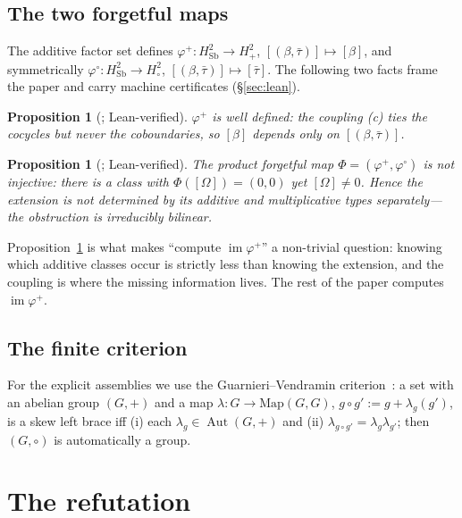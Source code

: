 \documentclass[11pt,reqno]{amsart}
\theoremstyle{plain}
\newtheorem{proposition}[theorem]{Proposition}
\theoremstyle{definition}
\newcommand{\Sb}{\mathrm{Sb}}
\newcommand{\im}{\operatorname{im}}
\newcommand{\Aut}{\operatorname{Aut}}
\begin{document}
\subsection{The two forgetful maps}
The additive factor set defines $\varphi^{+}\colon H^2_{\Sb}\to H^2_+$,
$[(\beta,\bar\tau)]\mapsto[\beta]$, and symmetrically
$\varphi^{\circ}\colon H^2_{\Sb}\to H^2_\circ$, $[(\beta,\bar\tau)]\mapsto[\bar\tau]$. The
following two facts frame the paper and carry machine certificates (\S\ref{sec:lean}).

\begin{proposition}[{\cite[Thm.~3.7]{BilinearNote}}; Lean-verified]\label{prop:descend}
$\varphi^{+}$ is well defined: the coupling (c) ties the \emph{cocycles} but never the
\emph{coboundaries}, so $[\beta]$ depends only on $[(\beta,\bar\tau)]$.
\end{proposition}

\begin{proposition}[{\cite[W$_4$]{BilinearNote}}; Lean-verified]\label{prop:noninj}
The product forgetful map $\Phi=(\varphi^{+},\varphi^{\circ})$ is \emph{not} injective:
there is a class with $\Phi([\Omega])=(0,0)$ yet $[\Omega]\neq0$. Hence the extension is
not determined by its additive and multiplicative types separately---the obstruction is
irreducibly bilinear.
\end{proposition}

Proposition~\ref{prop:noninj} is what makes ``compute $\im\varphi^{+}$'' a non-trivial
question: knowing which additive classes occur is strictly less than knowing the
extension, and the coupling is where the missing information lives. The rest of the paper
computes $\im\varphi^{+}$.

\subsection{The finite criterion}
For the explicit assemblies we use the Guarnieri--Vendramin
criterion~\cite{GuarnieriVendramin}: a set with an abelian group $(G,+)$ and a map
$\lambda\colon G\to\mathrm{Map}(G,G)$, $g\circ g':=g+\lambda_g(g')$, is a skew left brace
iff (i) each $\lambda_g\in\Aut(G,+)$ and (ii) $\lambda_{g\circ g'}=\lambda_g\lambda_{g'}$;
then $(G,\circ)$ is automatically a group.

\section{The refutation}\label{sec:refutation}
\end{document}
